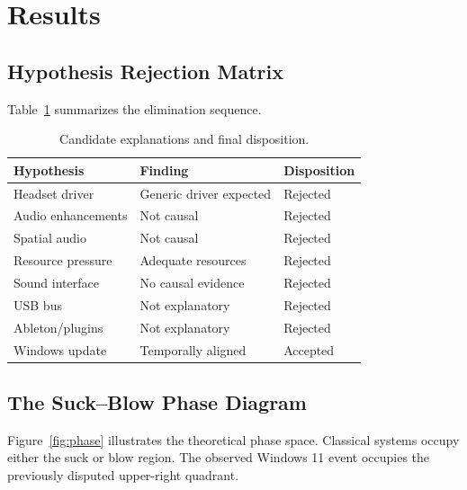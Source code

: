 \documentclass[10pt,twocolumn]{article}
\begin{document}
\section{Results}

\subsection{Hypothesis Rejection Matrix}

Table~\ref{tab:hypotheses} summarizes the elimination sequence.

\begin{table}[h]
\centering
\caption{Candidate explanations and final disposition.}
\label{tab:hypotheses}
\begin{tabular}{@{}lll@{}}
\toprule
Hypothesis & Finding & Disposition \\
\midrule
Headset driver & Generic driver expected & Rejected \\
Audio enhancements & Not causal & Rejected \\
Spatial audio & Not causal & Rejected \\
Resource pressure & Adequate resources & Rejected \\
Sound interface & No causal evidence & Rejected \\
USB bus & Not explanatory & Rejected \\
Ableton/plugins & Not explanatory & Rejected \\
Windows update & Temporally aligned & Accepted \\
\bottomrule
\end{tabular}
\end{table}

\subsection{The Suck--Blow Phase Diagram}

Figure~\ref{fig:phase} illustrates the theoretical phase space. Classical systems occupy either the suck or blow region. The observed Windows 11 event occupies the previously disputed upper-right quadrant.
\end{document}
